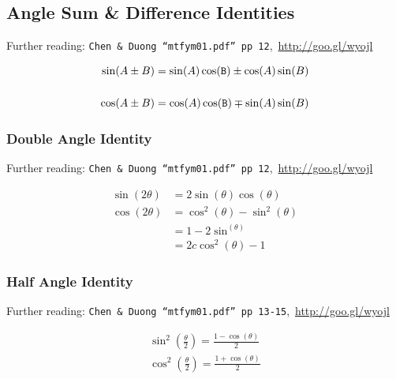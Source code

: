 \subsection{Angle Sum \& Difference Identities}
\label{subsec:TR Trigonometric Identities - Angle Sum Identities}
Further reading: \texttt{Chen \& Duong ``mtfym01.pdf'' pp 12},\, \url{http://goo.gl/wyojl}

\begin{align}
  \sin(A \pm B) &= \sin(A)\cos(\texttt{B}) \pm \cos(A)\sin(B) \\[0.5cm]
  \cos(A \pm B) &= \cos(A)\cos(\texttt{B}) \mp \sin(A)\sin(B)
\end{align}

\subsubsection{Double Angle Identity}
\label{subsubsec:TR Trigonometric Identities - Angle Sum Identities - Double Angle Identity}
Further reading: \texttt{Chen \& Duong ``mtfym01.pdf'' pp 12},\, \url{http://goo.gl/wyojl}

\begin{align}
  \sin(2\theta) & = 2\sin(\theta)\cos(\theta) \\[0.5cm]
  \cos(2\theta) & = \cos^2(\theta) - \sin^2(\theta) \\
                & = 1 - 2\sin^(\theta) \\
                & = 2c\cos^2(\theta) - 1
\end{align}

\subsubsection{Half Angle Identity}
\label{subsubsec:TR Trigonometric Identities - Angle Sum Identities - Half Angle Identity}
Further reading: \texttt{Chen \& Duong ``mtfym01.pdf'' pp 13-15},\, \url{http://goo.gl/wyojl}

\begin{align}
  \sin^2\left(\frac{\theta}{2}\right) = \frac{1 - \cos(\theta)}{2} \\[0.5cm]
  \cos^2\left(\frac{\theta}{2}\right) = \frac{1 + \cos(\theta)}{2}
\end{align}